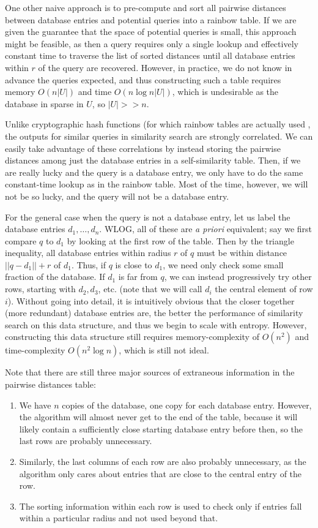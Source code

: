 \documentclass[review,preprint,12pt]{elsarticle}
\renewcommand{\cite}{\citep} %
\theoremstyle{definition}
\theoremstyle{remark}
\numberwithin{equation}{section}
\begin{document}
One other naive approach is to pre-compute and sort all pairwise distances between database entries and potential queries into a rainbow table.
If we are given the guarantee that the space of potential queries is small, this approach might be feasible, as then a query requires only a single lookup and effectively constant time to traverse the list of sorted distances until all database entries within $r$ of the query are recovered.
However, in practice, we do not know in advance the queries expected, and thus constructing such a table requires memory $O(n|U|)$ and time $O(n \log n |U|)$, which is undesirable as the database in sparse in $U$, so $|U| >>n$.

Unlike cryptographic hash functions (for which rainbow tables are actually used \cite{oechslin2003making}, the outputs for similar queries in similarity search are strongly correlated.
We can easily take advantage of these correlations by instead storing the pairwise distances among just the database entries in a self-similarity table.
Then, if we are really lucky and the query is a database entry, we only have to do the same constant-time lookup as in the rainbow table.
Most of the time, however, we will not be so lucky, and the query will not be a database entry.

For the general case when the query is not a database entry, let us label the database entries $d_1, \ldots, d_n$.
WLOG, all of these are \textit{a priori} equivalent; say we first compare $q$ to $d_1$ by looking at the first row of the table.
Then by the triangle inequality, all database entries within radius $r$ of $q$ must be within distance $||q-d_1|| +r$ of $d_1$.
Thus, if $q$ is close to $d_1$, we need only check some small fraction of the database.
If $d_1$ is far from $q$, we can instead progressively try other rows, starting with $d_2, d_3$, etc.
(note that we will call $d_i$ the central element of row $i$).
Without going into detail, it is intuitively obvious that the closer together (more redundant) database entries are, the better the performance of similarity search on this data structure, and thus we begin to scale with entropy.
However, constructing this data structure still requires memory-complexity of $O(n^2)$ and time-complexity $O(n^2 \log n)$, which is still not ideal.

Note that there are still three major sources of extraneous information in the pairwise distances table:

\begin{enumerate}
    \item We have $n$ copies of the database, one copy for each database entry.
However, the algorithm will almost never get to the end of the table, because it will likely contain a sufficiently close starting database entry before then, so the last rows are probably unnecessary.
    \item Similarly, the last columns of each row are also probably unnecessary, as the algorithm only cares about entries that are close to the central entry of the row.
    \item The sorting information within each row is used to check only if entries fall within a particular radius and not used beyond that.
\end{enumerate}
\end{document}
